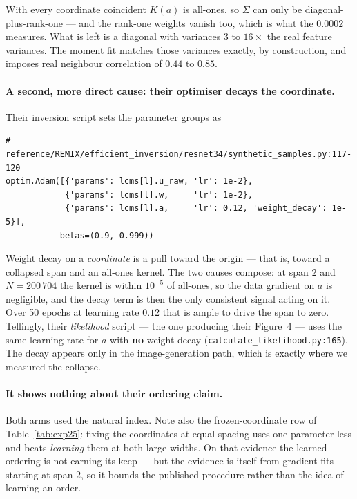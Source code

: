 \documentclass[11pt,a4paper]{article}
\newcommand{\code}[1]{\texttt{#1}}
\begin{document}
With every coordinate coincident $K(a)$ is all-ones, so $\Sigma$ can only be
diagonal-plus-rank-one --- and the rank-one weights vanish too, which is what the $0.0002$
measures. What is left is a diagonal with variances $3$ to $16\times$ the real feature
variances. The moment fit matches those variances exactly, by construction, and imposes real
neighbour correlation of $0.44$ to $0.85$.

\paragraph{A second, more direct cause: their optimiser decays the coordinate.} Their
inversion script sets the parameter groups as

\begin{lstlisting}[style=py]
# reference/REMIX/efficient_inversion/resnet34/synthetic_samples.py:117-120
optim.Adam([{'params': lcms[l].u_raw, 'lr': 1e-2},
            {'params': lcms[l].w,     'lr': 1e-2},
            {'params': lcms[l].a,     'lr': 0.12, 'weight_decay': 1e-5}],
           betas=(0.9, 0.999))
\end{lstlisting}

\noindent
Weight decay on a \emph{coordinate} is a pull toward the origin --- that is, toward a collapsed
span and an all-ones kernel. The two causes compose: at span $2$ and $N = 200\,704$ the kernel
is within $10^{-5}$ of all-ones, so the data gradient on $a$ is negligible, and the decay term
is then the only consistent signal acting on it. Over 50 epochs at learning rate $0.12$ that is
ample to drive the span to zero. Tellingly, their \emph{likelihood} script --- the one producing
their Figure~4 --- uses the same learning rate for $a$ with \textbf{no} weight decay
(\code{calculate\_likelihood.py:165}). The decay appears only in the image-generation path,
which is exactly where we measured the collapse.

\paragraph{It shows nothing about their ordering claim.} Both arms used the natural index. Note
also the frozen-coordinate row of Table~\ref{tab:exp25}: fixing the coordinates at equal
spacing uses one parameter less and beats \emph{learning} them at both large widths. On that
evidence the learned ordering is not earning its keep --- but the evidence is itself from
gradient fits starting at span $2$, so it bounds the published procedure rather than the idea
of learning an order.
\end{document}
